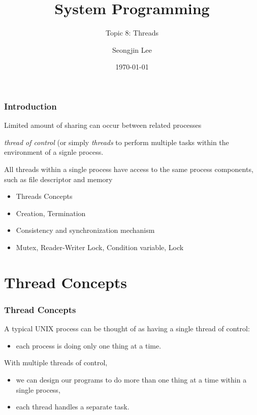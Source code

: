 \documentclass[newPxFont,sthlmFooter,nooffset]{beamer}
\title{System Programming}
\subtitle{Topic 8: Threads}
\author[SJL]{Seongjin Lee}
\institute{\href{mailto:insight@gnu.ac.kr}{insight@gnu.ac.kr}\\\url{http://open.gnu.ac.kr}\\Systems Research Lab.\\Gyeongsang National University}
\date{\today}
\begin{document}
\frame[plain]{\titlepage}






\begin{frame}[t]
  \frametitle{Introduction}

Limited amount of sharing can occur between related processes

\textit{thread of control} (or simply \textit{threads} to perform multiple tasks within the environment of a signle process.

All threads within a single process have access to the same process components, such as file descriptor and memory


  \begin{itemize}
  \item Threads Concepts
  \item Creation, Termination
  \item Consistency and synchronization mechanism
  \item Mutex, Reader-Writer Lock, Condition variable, Lock
  \end{itemize}

\end{frame}

\section{Thread Concepts}



\begin{frame}[t]
  \frametitle{Thread Concepts}
A typical UNIX process can be thought of as having a single thread of control:
\begin{itemize}
\item each process is doing only one thing at a time.
\end{itemize}

With multiple threads of control,
\begin{itemize}
\item we can design our programs to do more than one thing at a time
  within a single process,
\item each thread handles a separate task.
\end{itemize}


\end{frame}
\end{document}
